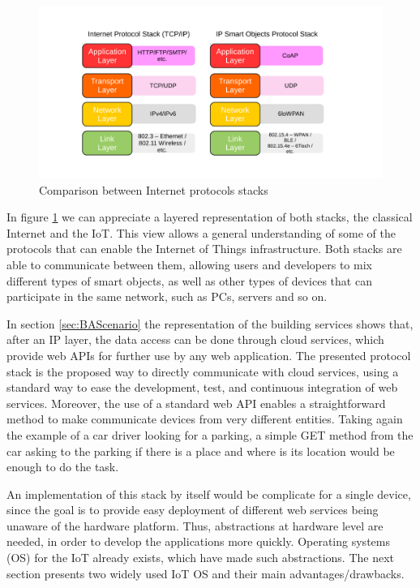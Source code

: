 \begin{figure}[htb]
	\centering
	\includegraphics[width=1\columnwidth]{chapters/background.images/Layers.pdf}
	\caption{Comparison between Internet protocols stacks}
	\label{fig:IPLayers}
\end{figure}

In figure \ref{fig:IPLayers} we can appreciate a layered representation of both stacks, the classical Internet and the IoT.
This view allows a general understanding of some of the protocols that can enable the Internet of Things infrastructure.
Both stacks are able to communicate between them, allowing users and developers to mix different types of smart objects, as well as other types of devices that can participate in the same network, such as PCs, servers and so on.

In section \ref{sec:BAScenario} the representation of the building services shows that, after an IP layer, the data access can be done through cloud services, which provide web APIs for further use by any web application.
The presented protocol stack is the proposed way to directly communicate with cloud services, using a standard way to ease the development, test, and continuous integration of web services.
Moreover, the use of a standard web API enables a straightforward method to make communicate devices from very different entities.
Taking again the example of a car driver looking for a parking, a simple GET method from the car asking to the parking if there is a place and where is its location would be enough to do the task.

An implementation of this stack by itself would be complicate for a single device, since the goal is to provide easy deployment of different web services being unaware of the hardware platform.
Thus, abstractions at hardware level are needed, in order to develop the applications more quickly.
Operating systems (OS) for the IoT already exists, which have made such abstractions.
The next section presents two widely used IoT OS and their main advantages/drawbacks.


